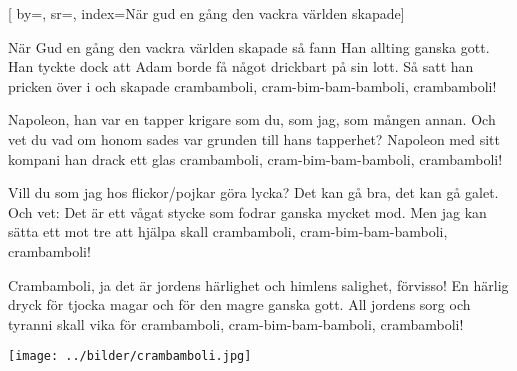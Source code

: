

[ 		%
	by={},					%
	sr={},					%
	index={När gud en gång den vackra världen skapade}]						%



\beginverse*						%
När Gud en gång den vackra världen skapade
så fann Han allting ganska gott.
Han tyckte dock att Adam borde
få något drickbart på sin lott.
Så satt han pricken över i
och skapade crambamboli,
cram-bim-bam-bamboli,
crambamboli!
\endverse							%

\beginverse*						%
Napoleon, han var en tapper krigare
som du, som jag, som mången annan.
Och vet du vad om honom sades
var grunden till hans tapperhet?
Napoleon med sitt kompani
han drack ett glas crambamboli,
cram-bim-bam-bamboli,
crambamboli!
\endverse							%


\beginverse*						%
Vill du som jag hos flickor/pojkar göra lycka?
Det kan gå bra, det kan gå galet.
Och vet: Det är ett vågat stycke
som fodrar ganska mycket mod.
Men jag kan sätta ett mot tre
att hjälpa skall crambamboli,
cram-bim-bam-bamboli,
crambamboli!
\endverse							%


\beginverse*						%
Crambamboli, ja det är jordens härlighet
och himlens salighet, förvisso!
En härlig dryck för tjocka magar
och för den magre ganska gott.
All jordens sorg och tyranni
skall vika för crambamboli,
cram-bim-bam-bamboli,
crambamboli!
\endverse							%
\endsong							%

\begin{intersong}
\begin{center}
\texttt{[image: ../bilder/crambamboli.jpg]} 
\end{center}
\end{intersong}